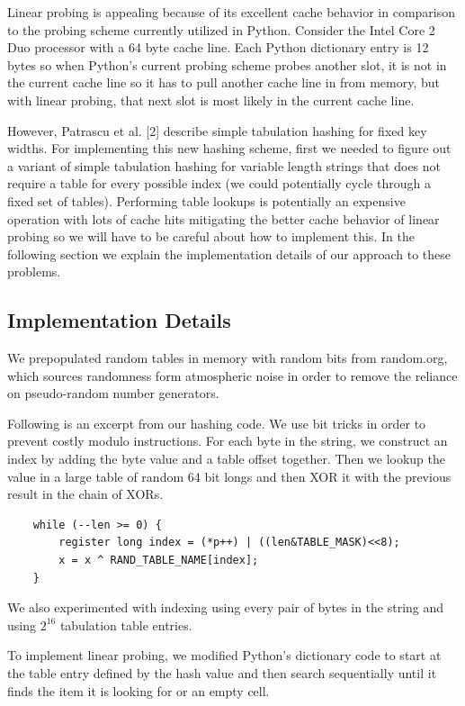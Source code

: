 \documentclass[11pt]{article}
\begin{document}
Linear probing is appealing because of its excellent cache behavior in comparison to the probing scheme currently utilized in Python.  Consider the Intel Core 2 Duo processor with a 64 byte cache line.  Each Python dictionary entry is 12 bytes so when Python’s current probing scheme probes another slot, it is not in the current cache line so it has to pull another cache line in from memory, but with linear probing, that next slot is most likely in the current cache line.

However, Patrascu et al. [2] describe simple tabulation hashing for fixed key widths.  For implementing this new hashing scheme, first we needed to figure out a variant of simple tabulation hashing for variable length strings that does not require a table for every possible index (we could potentially cycle through a fixed set of tables).  Performing table lookups is potentially an expensive operation with lots of cache hits mitigating the better cache behavior of linear probing so we will have to be careful about how to implement this. In the following section we explain the implementation details of our approach to these problems.

\subsection{Implementation Details}
We prepopulated random tables in memory with random bits from random.org, which
sources randomness form atmospheric noise in order to remove the reliance on
pseudo-random number generators.
      

      Following is an excerpt from our hashing code.  We use bit tricks in
      order to prevent costly modulo instructions.  For each byte in the
      string, we construct an index by adding the byte value and a table offset
      together.  Then we lookup the value in a large table of random 64 bit
      longs and then XOR it with the previous result in the chain of XORs.

       \begin{verbatim}
    while (--len >= 0) {
        register long index = (*p++) | ((len&TABLE_MASK)<<8);
        x = x ^ RAND_TABLE_NAME[index];
    }
       \end{verbatim}

We also experimented with indexing using every pair of bytes in the string and
using $2^16$ tabulation table entries.

To implement linear probing, we modified Python's dictionary code to start at
the table entry defined by the hash value and then search sequentially until it
finds the item it is looking for or an empty cell.
\end{document}
